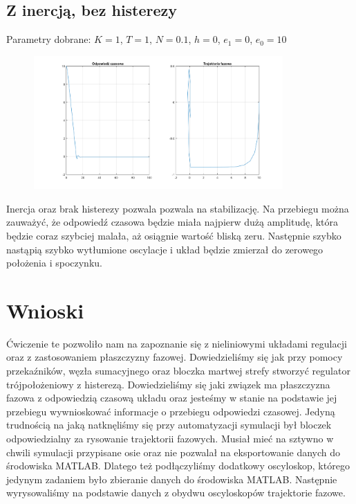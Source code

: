 \documentclass[a4paper, 12pt]{article}
\begin{document}
		\subsection{Z inercją, bez histerezy}
			Parametry dobrane: $K = 1$, $T = 1$, $N = 0.1$, $h = 0$, $e_1 = 0$, $e_0 = 10$
			\begin{figure}[H]
				\centering
				\includegraphics[width = 0.85\textwidth]{./img/K_1_T_1_N_1_h_0_e1_0_e0_100.png}
			\end{figure} \noindent
			Inercja oraz brak histerezy pozwala pozwala na stabilizację. Na przebiegu można zauważyć, że odpowiedź czasowa będzie miała najpierw dużą amplitudę, która będzie coraz szybciej malała, aż osiągnie wartość bliską zeru. Następnie szybko nastąpią szybko wytłumione oscylacje i układ będzie zmierzał do zerowego położenia i spoczynku.
	\section{Wnioski}
		Ćwiczenie te pozwoliło nam na zapoznanie się z nieliniowymi układami regulacji oraz z zastosowaniem płaszczyzny fazowej. Dowiedzieliśmy się jak przy pomocy przekaźników, węzła sumacyjnego oraz bloczka martwej strefy stworzyć regulator trójpołożeniowy z histerezą.
		\newline
		\newline 
		Dowiedzieliśmy się jaki związek ma płaszczyzna fazowa z odpowiedzią czasową układu oraz jesteśmy w stanie na podstawie jej przebiegu wywnioskować informacje o przebiegu odpowiedzi czasowej.
		\newline
		\newline
		Jedyną trudnością na jaką natknęliśmy się przy automatyzacji symulacji był bloczek odpowiedzialny za rysowanie trajektorii fazowych. Musiał mieć na sztywno w chwili symulacji przypisane osie oraz nie pozwalał na eksportowanie danych do środowiska MATLAB. Dlatego też podłączyliśmy dodatkowy oscyloskop, którego jedynym zadaniem było zbieranie danych do środowiska MATLAB. Następnie wyrysowaliśmy na podstawie danych z obydwu oscyloskopów trajektorie fazowe. 
\end{document}
